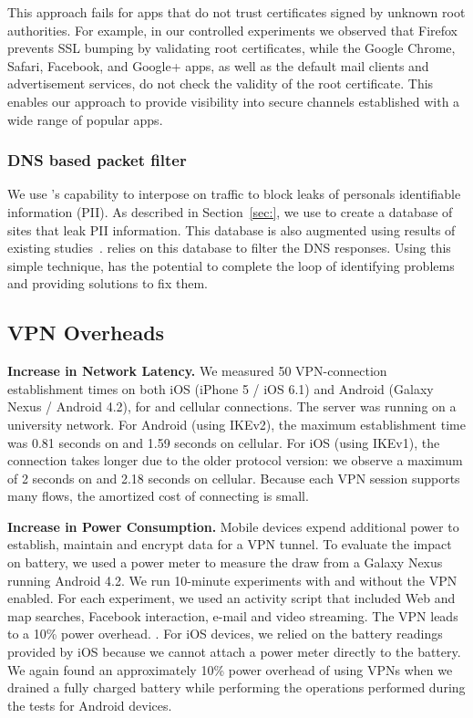 This approach fails for apps that do not trust certificates signed by unknown root authorities. 
For example, in our controlled experiments we observed that Firefox prevents SSL bumping by validating root certificates, while the Google Chrome, Safari, Facebook, and Google+ apps, as well as the default mail clients and advertisement services, do not check the validity of the root certificate. 
This enables our approach to provide visibility into secure channels established with a wide range of popular apps. 


\subsubsection{DNS based packet filter}

We use \meddle's capability to interpose on traffic to block leaks of personals identifiable information (PII).
As described in Section~\ref{sec:}, we use \meddle to create a database of sites that leak PII information. 
This database is also augmented using results of existing studies~\cite{vallina-rodriguez:bfc, hornyack:appfence,pathak:eprof}.
\meddle relies on this database to filter the DNS responses. 
Using this simple technique, \meddle has the potential to complete the loop of identifying problems and providing solutions to fix them. 

\subsection{VPN Overheads}

\noindent\textbf{Increase in Network Latency.}
We measured 50 VPN-connection establishment times  on both iOS (iPhone 5 / iOS 6.1) and Android (Galaxy Nexus /
Android 4.2), for \wifi{} and cellular connections. 
The \meddle server was running on a university network. 
For Android (using IKEv2), the maximum establishment time was 0.81 seconds on \wifi{} and 1.59 seconds on cellular. 
For iOS (using IKEv1), the connection takes longer due to the older protocol version: we observe a maximum of 2 seconds on \wifi{} and 2.18 seconds on cellular. 
Because each VPN session supports many flows, the amortized cost of connecting is  small. 

\noindent\textbf{Increase in Power Consumption.}
Mobile devices expend additional power to establish, maintain and encrypt data for a VPN tunnel. 
To evaluate the impact on battery, we used a power meter to measure the draw from a Galaxy Nexus running Android 4.2. 
We run 10-minute experiments with and without the VPN enabled. 
For each experiment, we used an activity script that included Web and map searches, Facebook interaction, e-mail and video
streaming. 
The VPN leads to a 10\% power overhead. . 
For iOS devices, we relied on the battery readings provided by iOS because we cannot attach a power meter directly to the battery.
We again found an approximately 10\% power overhead of using VPNs when we drained a fully charged battery while performing the operations performed during the tests for Android devices.  

